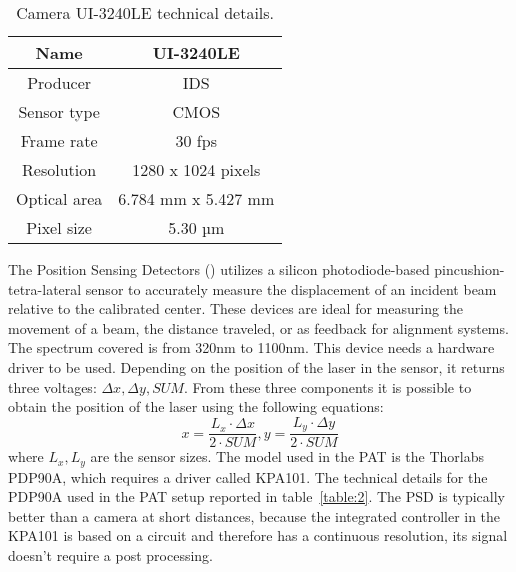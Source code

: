 \begin{table}[h!]
      \centering
      \begin{tabular}{ |c|c| }
            \hline
            Name         & UI-3240LE           \\\hline
            Producer     & IDS                 \\\hline
            Sensor type  & CMOS                \\\hline
            Frame rate   & 30 fps              \\\hline
            Resolution   & 1280 x 1024 pixels  \\\hline
            Optical area & 6.784 mm x 5.427 mm \\\hline
            Pixel size   & 5.30 µm             \\\hline
      \end{tabular}
      \caption{Camera UI-3240LE technical details.}
      \label{table:1}
\end{table}

The Position Sensing Detectors () utilizes a silicon photodiode-based pincushion-tetra-lateral sensor to accurately measure the displacement of an incident beam relative to the calibrated center. These devices are ideal for measuring the movement of a beam, the distance traveled, or as feedback for alignment systems.
The spectrum covered is from 320nm to 1100nm. This device needs a hardware driver to be used. Depending on the position of the laser in the sensor, it returns three voltages: $\Delta x, \Delta y, SUM$.
From these three components it is possible to obtain the position of the laser using the following equations:
\begin{equation}
      x = \frac{L_x \cdot \Delta x}{2 \cdot SUM}, y = \frac{L_y \cdot \Delta y}{2 \cdot  SUM}
\end{equation}
where $L_x,L_y$ are the sensor sizes. The model used in the PAT is the Thorlabs PDP90A, which requires a driver called KPA101. The technical details for the PDP90A used in the PAT setup reported in table~\ref{table:2}.
The PSD is typically better than a camera at short distances, because the integrated controller in the KPA101 is based on a circuit and therefore has a continuous resolution, its signal doesn't require a post processing.

